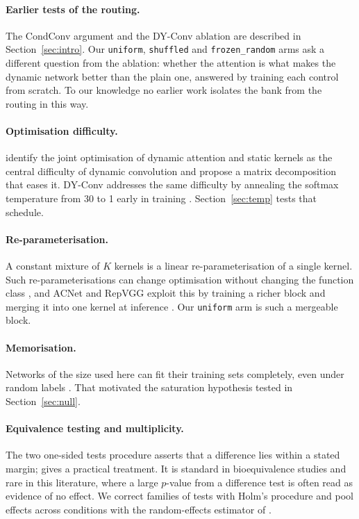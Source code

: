 \documentclass[10pt,a4paper]{article}
\begin{document}
\paragraph{Earlier tests of the routing.} The CondConv argument and the
DY-Conv ablation are described in Section~\ref{sec:intro}. Our
\texttt{uniform}, \texttt{shuffled} and \texttt{frozen\_random} arms ask a
different question from the ablation: whether the attention is what makes
the dynamic network better than the plain one, answered by training each
control from scratch. To our knowledge no earlier work isolates the bank
from the routing in this way.

\paragraph{Optimisation difficulty.} \citet{li2021dcd} identify the joint
optimisation of dynamic attention and static kernels as the central
difficulty of dynamic convolution and propose a matrix decomposition that
eases it. DY-Conv addresses the same difficulty by annealing the softmax
temperature from 30 to 1 early in training \citep{chen2020dynamic}.
Section~\ref{sec:temp} tests that schedule.

\paragraph{Re-parameterisation.} A constant mixture of $K$ kernels is a
linear re-parameterisation of a single kernel. Such re-parameterisations
can change optimisation without changing the function class
\citep{arora2018optimization}, and ACNet and RepVGG exploit this by
training a richer block and merging it into one kernel at inference
\citep{ding2019acnet,ding2021repvgg}. Our \texttt{uniform} arm is such a
mergeable block.

\paragraph{Memorisation.} Networks of the size used here can fit their
training sets completely, even under random labels \citep{zhang2017}.
That motivated the saturation hypothesis tested in Section~\ref{sec:null}.

\paragraph{Equivalence testing and multiplicity.} The two one-sided tests
procedure \citep{schuirmann1987} asserts that a difference lies within a
stated margin; \citet{lakens2017} gives a practical treatment. It is
standard in bioequivalence studies and rare in this literature, where a
large $p$-value from a difference test is often read as evidence of no
effect. We correct families of tests with Holm's procedure \citep{holm1979}
and pool effects across conditions with the random-effects estimator of
\citet{dersimonian1986}.
\end{document}
